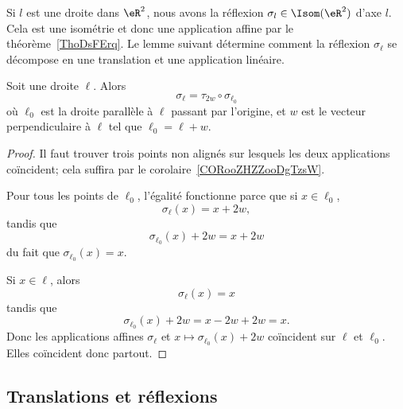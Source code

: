 \begin{normaltext}
	Si \( l\) est une droite dans \( \eR^2\), nous avons la réflexion \( \sigma_l\in\Isom(\eR^2)\) d'axe \( l\). Cela est une isométrie et donc une application affine par le théorème~\ref{ThoDsFErq}. Le lemme suivant détermine comment la réflexion \( \sigma_{\ell}\) se décompose en une translation et une application linéaire.
\end{normaltext}

\begin{lemma}   \label{LEMooVOJLooCFgdNG}
	Soit une droite \( \ell\). Alors
	\begin{equation}
		\sigma_{\ell}=\tau_{2w}\circ\sigma_{\ell_0}
	\end{equation}
	où \( \ell_0\) est la droite parallèle à \( \ell\) passant par l'origine, et \( w\) est le vecteur perpendiculaire à \( \ell\) tel que \( \ell_0=\ell+w\).
\end{lemma}

\begin{proof}
	Il faut trouver trois points non alignés sur lesquels les deux applications coïncident; cela suffira par le corolaire~\ref{CORooZHZZooDgTzsW}.

	Pour tous les points de \( \ell_0\), l'égalité fonctionne parce que si \( x\in\ell_0\),
	\begin{equation}
		\sigma_{\ell}(x)=x+2w,
	\end{equation}
	tandis que
	\begin{equation}
		\sigma_{\ell_0}(x)+2w=x+2w
	\end{equation}
	du fait que \( \sigma_{\ell_0}(x)=x\).

	Si \( x\in\ell\), alors
	\begin{equation}
		\sigma_{\ell}(x)=x
	\end{equation}
	tandis que
	\begin{equation}
		\sigma_{\ell_0}(x)+2w=x-2w+2w=x.
	\end{equation}
	Donc les applications affines \( \sigma_{\ell}\) et \( x\mapsto \sigma_{\ell_0}(x)+2w\) coïncident sur \( \ell\) et \( \ell_0\). Elles coïncident donc partout.
\end{proof}

\subsection{Translations et réflexions}

